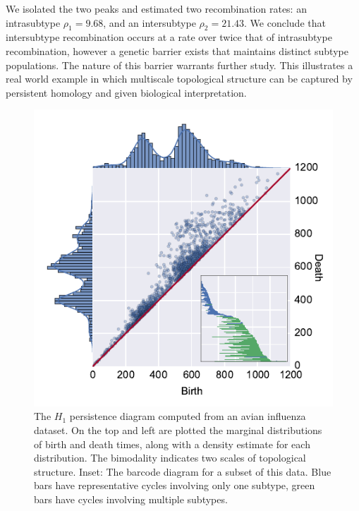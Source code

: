 We isolated the two peaks and estimated two recombination rates: an intrasubtype $\rho_{1}=9.68$, and an intersubtype $\rho_{2}=21.43$.
We conclude that intersubtype recombination occurs at a rate over twice that of intrasubtype recombination, however a genetic barrier exists that maintains distinct subtype populations.
The nature of this barrier warrants further study.
This illustrates a real world example in which multiscale topological structure can be captured by persistent homology and given biological interpretation.

\begin{figure}
\begin{center}
\centerline{\includegraphics[width=\columnwidth]{./fig/influenza/flu_scatterplot.pdf}}
\caption[$H_1$ persistence diagram computed from an avian influenza dataset.]{The $H_1$ persistence diagram computed from an avian influenza dataset. On the top and left are plotted the marginal distributions of birth and death times, along with a density estimate for each distribution. The bimodality indicates two scales of topological structure. Inset: The barcode diagram for a subset of this data. Blue bars have representative cycles involving only one subtype, green bars have cycles involving multiple subtypes.}
\label{fig:flu:scatterplot}
\end{center}
\end{figure}

